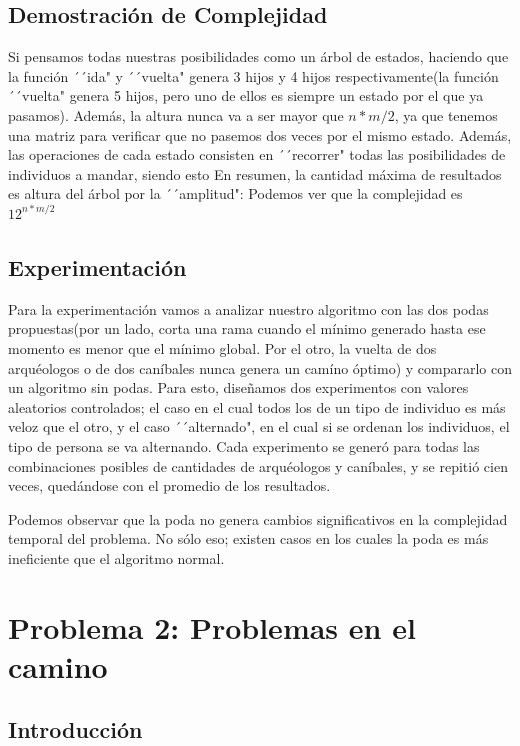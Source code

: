 \documentclass[spanish,12pt]{article}
\begin{document}
\subsection{Demostración de Complejidad}
	Si pensamos todas nuestras posibilidades como un árbol de estados, haciendo que la función ´´ida" y ´´vuelta" genera 3 hijos y 4 hijos respectivamente(la función ´´vuelta" genera 5 hijos, pero uno de ellos es siempre un estado por el que ya pasamos).
	 Además, la altura nunca va a ser mayor que $n*m/2$, ya que tenemos una matriz para verificar que no pasemos dos veces por el mismo estado. Además, las operaciones de cada estado consisten en ´´recorrer" todas las posibilidades de individuos a mandar, siendo esto %
	 En resumen, la cantidad máxima de resultados es altura del árbol por la ´´amplitud": Podemos ver que la complejidad es $12^{n*m/2}$
\subsection{Experimentación}
Para la experimentación vamos a analizar nuestro algoritmo con las dos podas propuestas(por un lado, corta una rama cuando el mínimo generado hasta ese momento es menor que el mínimo global. Por el otro, la vuelta de dos arquéologos o de dos caníbales nunca genera un camíno óptimo) y compararlo con un algoritmo sin podas. Para esto, diseñamos dos experimentos con valores aleatorios controlados; el caso en el cual todos los de un tipo de individuo es más veloz que el otro, y el caso ´´alternado", en el cual si se ordenan los individuos, el tipo de persona se va alternando. Cada experimento se generó para todas las combinaciones posibles de cantidades de arquéologos y caníbales, y se repitió cien veces, quedándose con el promedio de los resultados.


Podemos observar que la poda no genera cambios significativos en la complejidad temporal del problema. No sólo eso; existen casos en los cuales la poda es más ineficiente que el algoritmo normal. 

\section{Problema 2: Problemas en el camino}

\subsection{Introducción}
\end{document}
